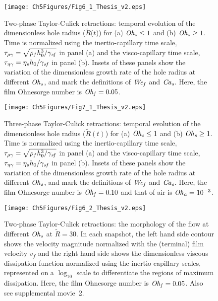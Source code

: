 \begin{sidewaysfigure}
	\centering
	\texttt{[image: Ch5Figures/Fig6\_1\_Thesis\_v2.eps]}	
	\caption{Two-phase Taylor-Culick retractions: temporal evolution of the dimensionless hole radius ($\tilde{R}$($t$)) for (a) $\mathit{Oh}_\mathit{s} \le 1$ and (b) $\mathit{Oh}_\mathit{s} \ge 1$. Time is normalized using the inertio-capillary time scale, $\tau_{\rho\gamma} = \sqrt{\rho_f h_0^3/\gamma_\mathit{sf}}$ in panel (a) and the visco-capillary time scale, $\tau_{\eta\gamma} = \eta_s h_0/\gamma_\mathit{sf}$ in panel (b). Insets of these panels show the variation of the dimensionless growth rate of the hole radius at different $\mathit{Oh}_\mathit{s}$, and mark the definitions of $\mathit{We}_\mathit{f}$ and $\mathit{Ca}_\mathit{s}$. Here, the film Ohnesorge number is $\mathit{Oh}_\mathit{f} = 0.05$.}
	\label{Ch6:fig:two-phaseTemporal}
\end{sidewaysfigure}

\begin{sidewaysfigure}
	\centering
	\texttt{[image: Ch5Figures/Fig7\_1\_Thesis\_v2.eps]}	
	\caption{Three-phase Taylor-Culick retractions: temporal evolution of the dimensionless hole radius ($\tilde{R}(t)$) for (a) $\mathit{Oh}_\mathit{s} \le 1$ and (b) $\mathit{Oh}_\mathit{s} \ge 1$. Time is normalized using the inertio-capillary time scale, $\tau_{\rho\gamma} = \sqrt{\rho_f h_0^3/\gamma_\mathit{sf}}$ in panel (a) and the visco-capillary time scale, $\tau_{\eta\gamma} = \eta_s h_0/\gamma_\mathit{sf}$ in panel (b). Insets of these panels show the variation of the dimensionless growth rate of the hole radius at different $\mathit{Oh}_\mathit{s}$, and mark the definitions of $\mathit{We}_\mathit{f}$ and $\mathit{Ca}_\mathit{s}$. Here, the film Ohnesorge number is $\mathit{Oh}_\mathit{f} = 0.10$ and that of air is $\mathit{Oh}_\mathit{a} = 10^{-3}$.}
	\label{Ch6:fig:three-phaseTemporal}
\end{sidewaysfigure}

\begin{figure}
	\centering
	\texttt{[image: Ch5Figures/Fig6\_2\_Thesis\_v2.eps]}	
	\caption{Two-phase Taylor-Culick retractions: the morphology of the flow at different $\mathit{Oh}_\mathit{s}$ at $\tilde{R} = 30$. In each snapshot, the left hand side contour shows the velocity magnitude normalized with the (terminal) film velocity $v_f$ and the right hand side shows the dimensionless viscous dissipation function normalized using the inertio-capillary scales, represented on a $\log_{\text{10}}$ scale to differentiate the regions of maximum dissipation. Here, the film Ohnesorge number is $\mathit{Oh}_\mathit{f} = 0.05$. Also see supplemental movie~{\color{Myfig}2}.}
	\label{Ch6:fig:two-phaseTemporal2}
\end{figure}


